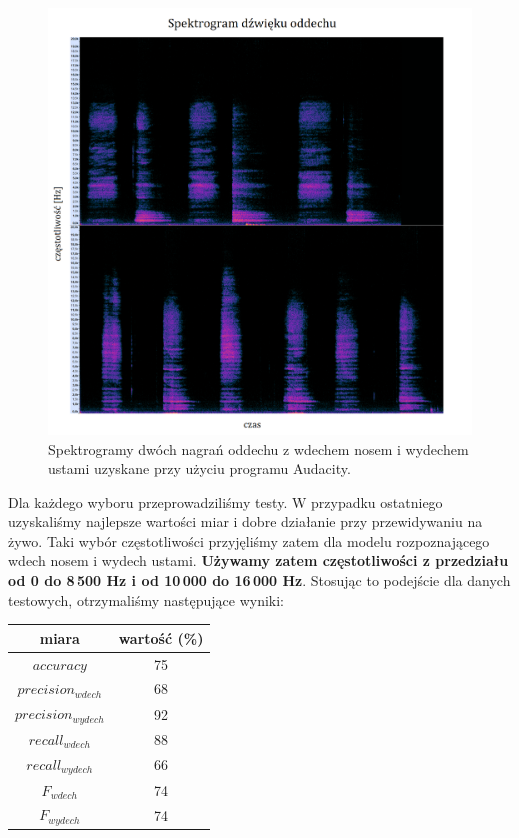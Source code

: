 \documentclass[polish]{article}
\begin{document}
\begin{figure}[H]
	\centering
	\includegraphics[width=13cm]{spektrogram_wydech_ustami}
	\caption{Spektrogramy dwóch nagrań oddechu z wdechem nosem i wydechem ustami uzyskane przy użyciu programu Audacity.}
\end{figure}
Dla każdego wyboru przeprowadziliśmy testy. W przypadku ostatniego uzyskaliśmy najlepsze wartości miar i dobre działanie przy przewidywaniu na żywo. 
Taki wybór częstotliwości przyjęliśmy zatem dla modelu rozpoznającego wdech nosem i wydech ustami.
 \textbf{Używamy zatem częstotliwości z przedziału od 0 do 8\,500 \unit{Hz} i od 10\,000 do 16\,000 \unit{Hz}}.
Stosując to podejście dla danych testowych, otrzymaliśmy następujące wyniki:
\begin{center}
\begin{tabular}{c  | c }
	miara & wartość (\%) \\
	\hline
	$accuracy$ & 75 \\
	$precision_{wdech}$ & 68 \\
	$precision_{wydech}$ & 92 \\
	$recall_{wdech}$ & 88 \\
	$recall_{wydech}$ & 66 \\
	$F_{wdech}$ & 74 \\
	$F_{wydech}$ & 74
\end{tabular}
\end{center}
\end{document}
